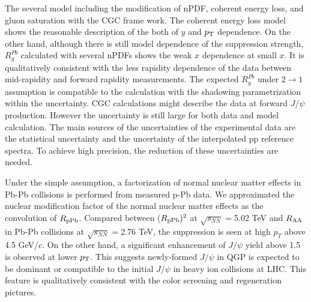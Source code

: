 The several model including the modification of nPDF, coherent energy loss, and gluon saturation with the CGC frame work. 
The coherent energy loss model shows the reasonable description of the both of $y$ and $p_{\rm{T}}$ dependence. 
On the other hand, although there is still model dependence of the suppression strength, $R_{g}^{Pb}$ calculated with several nPDFs shows the weak $x$ dependence at small $x$.
It is qualitatively consistent with the less rapidity dependence of the data between mid-rapidity and forward rapidity measurements.  
The expected $R_{g}^{Pb}$ under $2\rightarrow 1$ assumption is compatible to the calculation with the shadowing parametrization within the uncertainty. 
CGC calculations might describe the data at forward $J/\psi$ production. 
However the uncertainty is still large for both data and model calculation. 
The main sources of the uncertainties of the experimental data are the statistical uncertainty and the uncertainty of the interpolated pp reference spectra. 
To achieve high precision, the reduction of these uncertainties are needed.  



Under the simple assumption, a factorization of normal nuclear matter effects in Pb-Pb collisions is performed from measured p-Pb data.  
We approximated the nuclear modification factor of the normal nuclear matter effects as the convolution of $R_{\rm{pPb}}$. 
Compared between ($R_{\rm{pPb}})^{2}$ at $\sqrt{s_{NN}}=$5.02 TeV and $R_{\rm{AA}}$ in Pb-Pb collisions at $\sqrt{s_{NN}}=$2.76 TeV,  
the suppression is seen at high $p_{T}$ above 4.5 GeV/$c$. 
On the other hand, a significant enhancement of $J/\psi$ yield above 1.5 is observed at lower $p_{\rm{T}}$.
This suggests newly-formed $J/\psi$ in QGP is expected to be dominant or compatible to the initial $J/\psi$ in heavy ion collisions at LHC.
This feature is qualitatively consistent with the color screening and regeneration pictures. 


